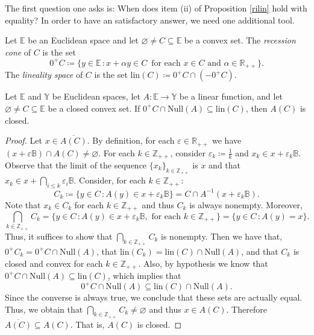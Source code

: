 \documentclass[a4paper]{article}
\begin{document}
The first question one asks is: When does item (ii) of Proposition
\ref{rilin} hold with equality? In order to have an satisfactory
answer, we need one additional tool.

\begin{definition}
Let \(\mathbb{E}\) be an Euclidean space and let \(\varnothing\not =
C\subseteq\mathbb{E}\) be a convex set. The \emph{recession cone} of \(C\)
is the set
\[0^+C\coloneqq\{y\in\mathbb{E}\,\colon x+\alpha y\in C\, \text{ for each } x\in
  C\text{ and } \alpha\in\mathbb{R}_{++}\}.\]
The \emph{lineality space} of \(C\) is the set \(\text{lin}(C)\coloneqq 0^+C\cap(-0^+C)\).
\end{definition}


\begin{lemma}\label{imgfech}
Let $\mathbb{E}$ and  $\mathbb{Y}$ be Euclidean spaces, let $A\colon\mathbb{E}\to\mathbb{Y}$ be a linear function, and let $\varnothing\not=C\subseteq \mathbb{E}$ be a closed convex set. If $0^+C\cap\text{Null}(A)\subseteq\text{lin}(C)$, then $A(C)$ is closed.  
\end{lemma}
\begin{proof}
Let $x\in\overline{A(C)}$. By definition, for each $\varepsilon\in\mathbb{R}_{++}$ we have $(x+\varepsilon\mathbb{B})\cap A(C)\not=\varnothing$. For each $k\in\mathbb{Z}_{++}$, consider $\varepsilon_k\coloneqq\frac{1}{k}$ and $x_k\in x+\varepsilon_k\mathbb{B}$. Observe that the limit of the sequence $\{x_k\}_{k\in\mathbb{Z}_{++}}$ is $x$ and that $x_k\in x+\bigcap_{i\leq k}\varepsilon_i\mathbb{B}$. Consider, for each $k\in\mathbb{Z}_{++}$:
$$C_k\coloneqq\{y\in C\,\colon A(y)\in x+\varepsilon_k\mathbb{B}\}= C\cap A^{-1}(x+\varepsilon_k\mathbb{B}).$$
 Note that $x_k\in C_k$ for each $k\in\mathbb{Z}_{++}$ and thus $C_k$ is always nonempty. Moreover,
$$\bigcap_{k\in\mathbb{Z}_{++}}C_k=\{y\in C\,\colon A(y)\in x+\varepsilon_k\mathbb{B},\text{ for each } k\in\mathbb{Z}_{++}\}=\{y\in C\,\colon A(y)=x\}.$$
Thus, it suffices to show that $\bigcap_{k\in\mathbb{Z}_{++}}C_k$ is nonempty. Then we have that, $0^+C_k=0^+C\cap\text{Null}(A)$, that $\text{lin}(C_k)=\text{lin}(C)\cap\text{Null}(A)$, and that $C_k$ is closed and convex for each $k\in\mathbb{Z}_{++}$.
Also, by hypothesis we know that $0^+C\cap\text{Null}(A)\subseteq\text{lin}(C)$, which implies that
$$0^+C\cap\text{Null}(A)\subseteq \text{lin}(C)\cap\text{Null}(A).$$
Since the converse is always true, we conclude that these sets are actually equal. Thus, we obtain that $\bigcap_{k\in\mathbb{Z}_{++}}C_k\not=\varnothing$ and thus $x\in A(C)$. Therefore $\overline{A(C)}\subseteq A(C)$. That is, $A(C)$ is closed.
\end{proof}
\end{document}
